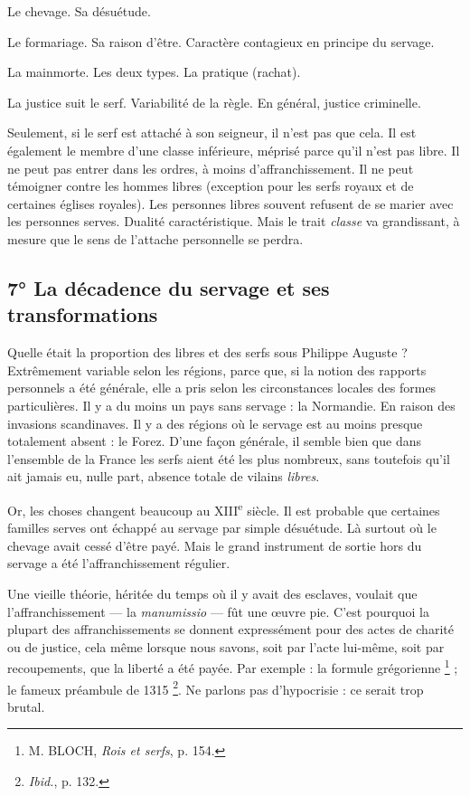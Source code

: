 \documentclass[french,twoside]{book} %
\begin{document}
\begin{listalpha}[itemsep=0pt,]
\item[] \hspace{-1.5em}{\bfseries Ceci dit, voyons les charges typiques :}
\item Le chevage. Sa désuétude.
\item Le formariage. Sa raison d’être. Caractère contagieux en principe du servage.
\item La mainmorte. Les deux types. La pratique (rachat).
\item La justice suit le serf. Variabilité de la règle. En général, justice criminelle.

\end{listalpha}\noindent Seulement, si le serf est attaché à son seigneur, il n’est pas que cela. Il est également le membre d’une classe inférieure, méprisé parce qu’il n’est pas libre. Il ne peut pas entrer dans les ordres, à moins d’affranchissement. Il ne peut témoigner contre les hommes libres (exception pour les serfs royaux et de certaines églises royales). Les personnes libres souvent refusent de se marier avec les personnes serves. Dualité caractéristique. Mais le trait \emph{classe} va grandissant, à mesure que le sens de l’attache personnelle se perdra.
\subsection[7° La décadence du servage et ses transformations]{7° La décadence du servage et ses transformations}
\noindent Quelle était la proportion des libres et des serfs sous Philippe Auguste ? Extrêmement variable selon les régions, parce que, si la notion des rapports personnels a été générale, elle a pris selon les circonstances locales des formes particulières. Il y a du moins un pays sans servage : la Normandie. En raison des invasions scandinaves. Il y a des régions où le servage est au moins presque totalement absent : le Forez. D’une façon générale, il semble bien que dans l’ensemble de la France les serfs aient été les plus nombreux, sans toutefois qu’il ait jamais eu, nulle part, absence totale de vilains \emph{libres}.\par
Or, les choses changent beaucoup au XIII\textsuperscript{e} siècle. Il est probable que certaines familles serves ont échappé au servage par simple désuétude. Là surtout où le chevage avait cessé d’être payé. Mais le grand instrument de sortie hors du servage a été l’affranchissement régulier.\par
Une vieille théorie, héritée du temps où il y avait des esclaves, voulait que l’affranchissement — la \emph{manumissio} — fût une œuvre pie. C’est pourquoi la plupart des affranchissements se donnent expressément pour des actes de charité ou de justice, cela même lorsque nous savons, soit par l’acte lui-même, soit par recoupements, que la liberté a été payée. Par exemple : la formule grégorienne \footnote{ M. BLOCH, {\itshape Rois et serfs}, p. 154. } ; le fameux préambule de 1315 \footnote{{\itshape Ibid.}, p. 132.}. Ne parlons pas d’hypocrisie : ce serait trop brutal.\par
\end{document}
